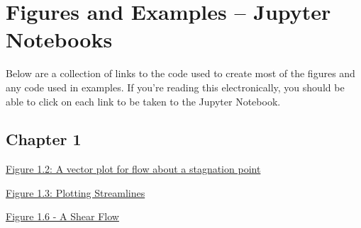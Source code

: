 
\chapter{Figures and Examples -- Jupyter Notebooks}

Below are a collection of links to the code used to create most of the figures and any code used in examples.  If you're reading this electronically, you should be able to click on each link to be taken to the Jupyter Notebook.

\section{Chapter 1}

\href{https://nbviewer.jupyter.org/github/josephmacmillan/IntroFluidDynamics/blob/master/Jupyter/1%20-%20Introduction.ipynb#Figure-1.2:-A-vector-plot-for-flow-about-a-stagnation-point}{Figure 1.2: A vector plot for flow about a stagnation point}

\noindent \href{https://nbviewer.jupyter.org/github/josephmacmillan/IntroFluidDynamics/blob/master/Jupyter/1%20-%20Introduction.ipynb#Figure-1.3:-Plotting-Streamlines}{Figure 1.3: Plotting Streamlines}

\noindent \href{https://nbviewer.jupyter.org/github/josephmacmillan/IntroFluidDynamics/blob/master/Jupyter/1%20-%20Introduction.ipynb#Figure-1.6:-a-shear-flow}{Figure 1.6 - A Shear Flow}
